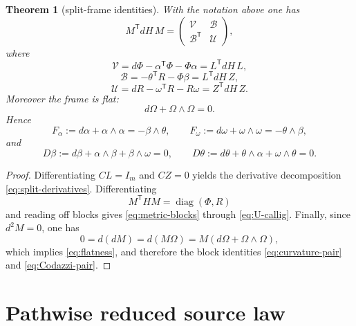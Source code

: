 \documentclass[11pt,a4paper]{article}
\numberwithin{equation}{section}
\DeclareMathOperator{\diag}{diag}
\theoremstyle{thmcompact}
\newtheorem{theorem}{Theorem}[section]
\theoremstyle{remark}
\begin{document}
\begin{theorem}[split-frame identities]\label{thm:split-frame-identities}
With the notation above one has
\begin{equation}
M^{\mathsf T}dH\,M=
\begin{pmatrix}
\mathcal V & \mathcal B\\
\mathcal B^{\mathsf T} & \mathcal U
\end{pmatrix},
\label{eq:metric-blocks}
\end{equation}
where
\begin{equation}
\mathcal V=d\Phi-\alpha^{\mathsf T}\Phi-\Phi\alpha=L^{\mathsf T}dH\,L,
\label{eq:V-callig}
\end{equation}
\begin{equation}
\mathcal B=-\theta^{\mathsf T}R-\Phi\beta=L^{\mathsf T}dH\,Z,
\label{eq:B-callig}
\end{equation}
\begin{equation}
\mathcal U=dR-\omega^{\mathsf T}R-R\omega=Z^{\mathsf T}dH\,Z.
\label{eq:U-callig}
\end{equation}
Moreover the frame is flat:
\begin{equation}
d\Omega+\Omega\wedge\Omega=0.
\label{eq:flatness}
\end{equation}
Hence
\begin{equation}
F_{\alpha}:=d\alpha+\alpha\wedge\alpha=-\beta\wedge\theta,
\qquad
F_{\omega}:=d\omega+\omega\wedge\omega=-\theta\wedge\beta,
\label{eq:curvature-pair}
\end{equation}
and
\begin{equation}
D\beta:=d\beta+\alpha\wedge\beta+\beta\wedge\omega=0,
\qquad
D\theta:=d\theta+\theta\wedge\alpha+\omega\wedge\theta=0.
\label{eq:Codazzi-pair}
\end{equation}
\end{theorem}

\begin{proof}
Differentiating $CL=I_m$ and $CZ=0$ yields the derivative decomposition \eqref{eq:split-derivatives}. Differentiating
\[
M^{\mathsf T}HM=\diag(\Phi,R)
\]
and reading off blocks gives \eqref{eq:metric-blocks} through \eqref{eq:U-callig}. Finally, since $d^2M=0$, one has
\[
0=d(dM)=d(M\Omega)=M(d\Omega+\Omega\wedge\Omega),
\]
which implies \eqref{eq:flatness}, and therefore the block identities \eqref{eq:curvature-pair} and \eqref{eq:Codazzi-pair}.
\end{proof}

\section{Pathwise reduced source law}
\end{document}
